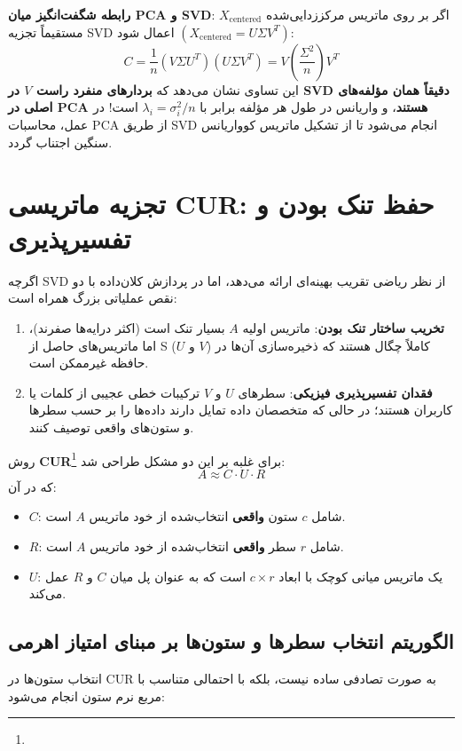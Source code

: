 \textbf{رابطه شگفت‌انگیز میان PCA و SVD}:
اگر بر روی ماتریس مرکززدایی‌شده $X_{\text{centered}}$ مستقیماً تجزیه SVD اعمال شود $(X_{\text{centered}} = U \Sigma V^T)$:
\begin{equation}
C = \frac{1}{n} (V \Sigma U^T)(U \Sigma V^T) = V \left( \frac{\Sigma^2}{n} \right) V^T
\end{equation}
این تساوی نشان می‌دهد که \textbf{بردارهای منفرد راست $V$ در SVD دقیقاً همان مؤلفه‌های اصلی در PCA هستند}، و واریانس در طول هر مؤلفه برابر با $\lambda_i = \sigma_i^2 / n$ است! در عمل، محاسبات PCA از طریق SVD انجام می‌شود تا از تشکیل ماتریس کوواریانس سنگین اجتناب گردد.

\section{تجزیه ماتریسی CUR: حفظ تنک بودن و تفسیرپذیری}
اگرچه SVD از نظر ریاضی تقریب بهینه‌ای ارائه می‌دهد، اما در پردازش کلان‌داده با دو نقص عملیاتی بزرگ همراه است:
\begin{enumerate}
    \item \textbf{تخریب ساختار تنک بودن}: ماتریس اولیه $A$ بسیار تنک است (اکثر درایه‌ها صفرند)، اما ماتریس‌های حاصل از S ($U$ و $V$) کاملاً چگال  هستند که ذخیره‌سازی آن‌ها در حافظه غیرممکن است.
    \item \textbf{فقدان تفسیرپذیری فیزیکی}: سطرهای $U$ و $V$ ترکیبات خطی عجیبی از کلمات یا کاربران هستند؛ در حالی که متخصصان داده تمایل دارند داده‌ها را بر حسب سطرها و ستون‌های واقعی توصیف کنند.
\end{enumerate}

روش \textbf{CUR}\footnote{} برای غلبه بر این دو مشکل طراحی شد:
\begin{equation}
A \approx C \cdot U \cdot R
\end{equation}
که در آن:
\begin{itemize}
    \item $C$: شامل $c$ ستون \textbf{واقعی} انتخاب‌شده از خود ماتریس $A$ است.
    \item $R$: شامل $r$ سطر \textbf{واقعی} انتخاب‌شده از خود ماتریس $A$ است.
    \item $U$: یک ماتریس میانی کوچک با ابعاد $c \times r$ است که به عنوان پل میان $C$ و $R$ عمل می‌کند.
\end{itemize}

\subsection{الگوریتم انتخاب سطرها و ستون‌ها بر مبنای امتیاز اهرمی}
انتخاب ستون‌ها در CUR به صورت تصادفی ساده نیست، بلکه با احتمالی متناسب با مربع نرم ستون انجام می‌شود:

